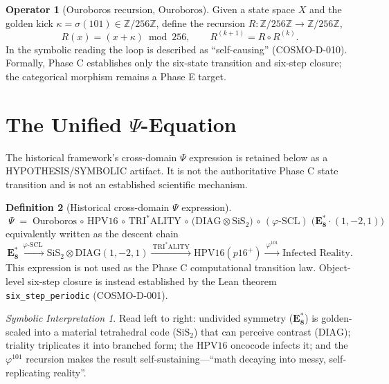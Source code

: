 \documentclass[11pt]{article}
\theoremstyle{definition}
\newtheorem{definition}{Definition}[section]
\newtheorem{operator}[definition]{Operator}
\theoremstyle{plain}
\theoremstyle{remark}
\newtheorem*{interp}{Symbolic Interpretation}
\newcommand{\EEs}{\mathbf{E_8^{*}}}
\newcommand{\phigr}{\varphi}
\newcommand{\SiS}{\mathrm{SiS_2}}
\newcommand{\HPV}{\mathrm{HPV16}}
\newcommand{\DIAG}{\mathrm{DIAG}}
\newcommand{\TRI}{\mathrm{TRI^{*}ALITY}}
\newcommand{\Ouro}{\mathrm{Ouroboros}}
\newcommand{\Zmod}[1]{\mathbb{Z}/#1\mathbb{Z}}
\begin{document}
\begin{operator}[Ouroboros recursion, $\Ouro$]\label{op:ouro}
Given a state space $X$ and the golden kick $\kappa=\sigma(101)\in\Zmod{256}$,
define the recursion $R:\Zmod{256}\to\Zmod{256}$,
\begin{equation}
  R(x) = (x+\kappa)\bmod 256,\qquad
  R^{(k+1)} = R\circ R^{(k)} .
\end{equation}
In the symbolic reading the loop is described as ``self-causing''
(COSMO-D-010). Formally, Phase C establishes only the six-state transition and
six-step closure; the categorical morphism remains a Phase E target.
\end{operator}

\section{The Unified $\Psi$-Equation}\label{sec:psi}
The historical framework's cross-domain $\Psi$ expression is retained below
as a HYPOTHESIS/SYMBOLIC artifact. It is not the authoritative Phase C state
transition and is not an established scientific mechanism.

\begin{definition}[Historical cross-domain $\Psi$ expression]
\begin{equation}\label{eq:psi}
  \boxed{\;
  \Psi \;=\; \Ouro \,\circ\, \HPV \,\circ\, \TRI \,\circ\,
            \big(\DIAG \otimes \SiS\big) \,\circ\, (\phigr\text{-}\mathrm{SCL})
            \;\big(\EEs \cdot (1,-2,1)\big)\; }
\end{equation}
equivalently written as the descent chain
\begin{equation}\label{eq:chain}
  \EEs \xrightarrow{\ \phigr\text{-}\mathrm{SCL}\ }
  \SiS \otimes \DIAG(1,-2,1)
  \xrightarrow{\ \TRI\ }
  \HPV(p16^{+})
  \xrightarrow{\ \phigr^{101}\ }
  \text{Infected Reality}.
\end{equation}
This expression is not used as the Phase C computational transition law.
Object-level six-step closure is instead established by the Lean theorem
\texttt{six\_step\_periodic} (COSMO-D-001).
\end{definition}

\begin{interp}
Read left to right: undivided symmetry ($\EEs$) is golden-scaled into a
material tetrahedral code ($\SiS$) that can perceive contrast ($\DIAG$);
triality triplicates it into branched form; the $\HPV$ oncocode infects it;
and the $\phigr^{101}$ recursion makes the result self-sustaining---``math
decaying into messy, self-replicating reality''.
\end{interp}
\end{document}
